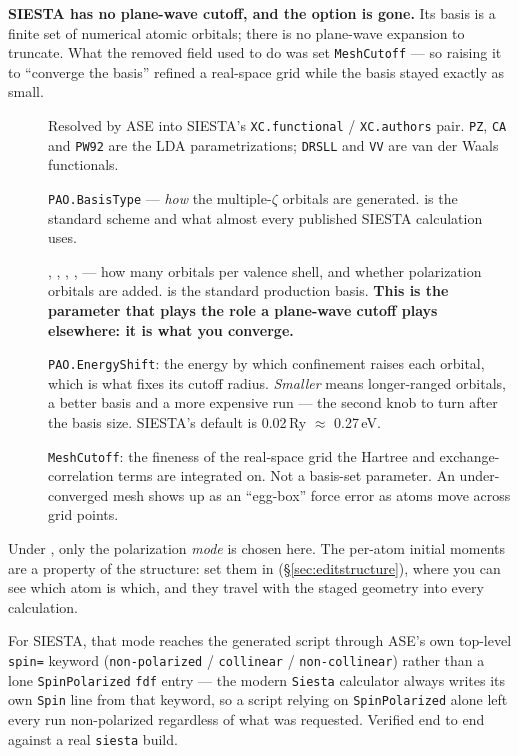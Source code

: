 \textbf{SIESTA has no plane-wave cutoff, and the option is gone.} Its basis is
a finite set of numerical atomic orbitals; there is no plane-wave expansion to
truncate. What the removed field used to do was set \texttt{MeshCutoff} ---
so raising it to ``converge the basis'' refined a real-space grid while the
basis stayed exactly as small.

\begin{description}
  \item[] Resolved by ASE into SIESTA's
    \texttt{XC.functional} / \texttt{XC.authors} pair. \texttt{PZ},
    \texttt{CA} and \texttt{PW92} are the LDA parametrizations; \texttt{DRSLL}
    and \texttt{VV} are van der Waals functionals.
  \item[] \texttt{PAO.BasisType} --- \emph{how} the
    multiple-$\zeta$ orbitals are generated.  is the standard
    scheme and what almost every published SIESTA calculation uses.
  \item[] , , , ,
     --- how many orbitals per valence shell, and whether
    polarization orbitals are added.  is the standard production
    basis. \textbf{This is the parameter that plays the role a plane-wave
    cutoff plays elsewhere: it is what you converge.}
  \item[] \texttt{PAO.EnergyShift}: the energy by which
    confinement raises each orbital, which is what fixes its cutoff radius.
    \emph{Smaller} means longer-ranged orbitals, a better basis and a more
    expensive run --- the second knob to turn after the basis size. SIESTA's
    default is 0.02\,Ry $\approx$ 0.27\,eV.
  \item[] \texttt{MeshCutoff}: the fineness of the real-space
    grid the Hartree and exchange-correlation terms are integrated on. Not a
    basis-set parameter. An under-converged mesh shows up as an ``egg-box''
    force error as atoms move across grid points.
\end{description}

Under , only the polarization \emph{mode} is chosen
here. The per-atom initial moments are a property of the structure: set them in
 (\S\ref{sec:editstructure}), where you can see which
atom is which, and they travel with the staged geometry into every calculation.

\begin{calnote}
For SIESTA, that mode reaches the generated script through ASE's own
top-level \texttt{spin=} keyword (\texttt{non-polarized} /
\texttt{collinear} / \texttt{non-collinear}) rather than a lone
\texttt{SpinPolarized} \texttt{fdf} entry --- the modern \texttt{Siesta}
calculator always writes its own \texttt{Spin} line from that keyword, so a
script relying on \texttt{SpinPolarized} alone left every run
non-polarized regardless of what was requested. Verified end to end against
a real \texttt{siesta} build.
\end{calnote}

